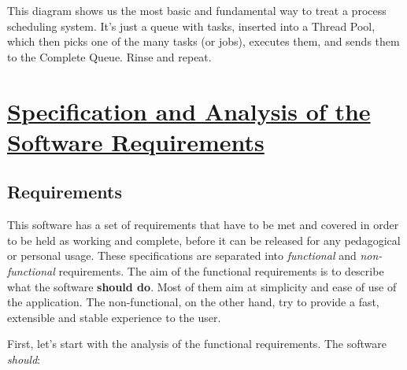 \documentclass{article}
\begin{document}
This diagram shows us the most basic and fundamental way to treat a process scheduling system. It's just a queue with tasks, inserted into a Thread Pool, which then picks one of the many tasks (or jobs), executes them, and sends them to the Complete Queue. Rinse and repeat.

\section{\underline{Specification and Analysis of the Software Requirements}}

\subsection{Requirements}

This software has a set of requirements that have to be met and covered in order to be held as working and complete, before it can be released for any pedagogical or personal usage. These specifications are separated into \textit{functional} and \textit{non-functional} requirements. The aim of the functional requirements is to describe what the software \textbf{should do}. Most of them aim at simplicity and ease of use of the application. The non-functional, on the other hand, try to provide a fast, extensible and stable experience to the user.

First, let's start with the analysis of the functional requirements. The software \textit{should}:
\end{document}
